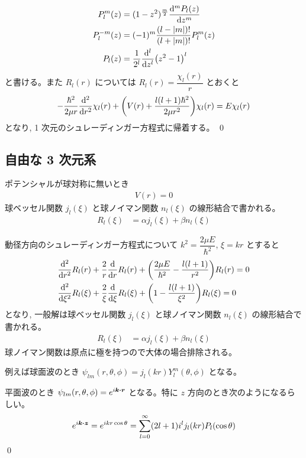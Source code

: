 \documentclass[uplatex,dvipdfmx,a4paper,11pt]{jlreq}
\makeatletter
\theoremstyle{definition}
\renewenvironment{proof}[1][\proofname]{\par
  \normalfont
  \topsep6\p@\@plus6\p@ \trivlist
  \item[\hskip\labelsep{\bfseries #1}\@addpunct{\bfseries}]\ignorespaces\quad\par
}{%
  \qed\endtrivlist\@endpefalse
}
\renewcommand\proofname{証明}
\makeatother
\begin{document}
\begin{proof}
\begin{align}
    P_l^m(z)            & = (1 - z^2)^{\frac{m}{2}}\dv[m]{P_l(z)}{z}                                                               \\
    P_l^{-m}(z)         & = (-1)^m\frac{(l - |m|)!}{(l + |m|)!}P_l^m(z)                                                            \\
    P_l(z)              & = \frac{1}{2^l}\dv[l]{z}(z^2 - 1)^l
  \end{align}
  と書ける。また $R_l(r)$ については $R_l(r) = \dfrac{\chi_l(r)}{r}$ とおくと
  \begin{align}
    - \frac{\hbar^2}{2\mu r}\dv[2]{r}\chi_l(r) + \qty(V(r) + \frac{l(l+1)\hbar^2}{2\mu r^2})\chi_l(r) = E\chi_l(r)
  \end{align}
  となり, 1 次元のシュレーディンガー方程式に帰着する。
\end{proof}



\subsection{自由な 3 次元系}
\begin{proposition}
  ポテンシャルが球対称に無いとき
  \begin{align}
    V(r) = 0
  \end{align}
  球ベッセル関数 $j_l(\xi)$ と球ノイマン関数 $n_l(\xi)$ の線形結合で書かれる。
  \begin{align}
    R_l(\xi) & = \alpha j_l(\xi) + \beta n_l(\xi)
  \end{align}
\end{proposition}
\begin{proof}
  動径方向のシュレーディンガー方程式について $k^2 = \dfrac{2\mu E}{\hbar^2}$, $\xi = kr$ とすると
  \begin{align}
     & \dv[2]{r}R_l(r) + \frac{2}{r}\dv{r}R_l(r) + \qty(\frac{2\mu E}{\hbar^2} - \frac{l(l+1)}{r^2})R_l(r) = 0 \\
     & \dv[2]{\xi}R_l(\xi) + \frac{2}{\xi}\dv{\xi}R_l(\xi) + \qty(1 - \frac{l(l+1)}{\xi^2})R_l(\xi) = 0
  \end{align}
  となり, 一般解は球ベッセル関数 $j_l(\xi)$ と球ノイマン関数 $n_l(\xi)$ の線形結合で書かれる。
  \begin{align}
    R_l(\xi) & = \alpha j_l(\xi) + \beta n_l(\xi)
  \end{align}
  球ノイマン関数は原点に極を持つので大体の場合排除される。

  例えば球面波のとき $\psi_{lm}(r, \theta, \phi) = j_l(kr)Y_l^m(\theta,\phi)$ となる。

  平面波のとき $\psi_{lm}(r, \theta, \phi) = e^{i\bm{k}\vdot\bm{r}}$ となる。特に $z$ 方向のとき次のようになるらしい。
  \begin{align}
    e^{i\bm{k}\vdot\bm{z}} = e^{ikr\cos\theta} = \sum_{l = 0}^\infty (2l + 1)i^lj_l(kr)P_l(\cos\theta)
  \end{align}
\end{proof}
\end{document}
